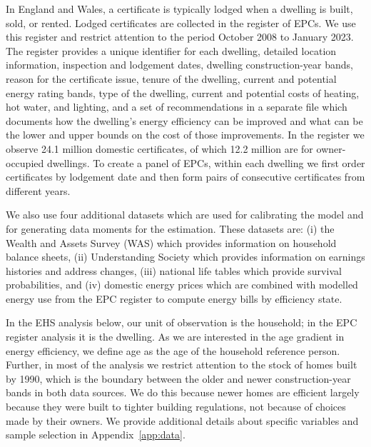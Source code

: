 In England and Wales, a certificate is typically lodged when a dwelling is built, sold, or rented. Lodged certificates are collected in the register of EPCs. We use this register and restrict attention to the period October 2008 to January 2023. The register provides a unique identifier for each dwelling, detailed location information, inspection and lodgement dates, dwelling construction-year bands, reason for the certificate issue, tenure of the dwelling, current and potential energy rating bands, type of the dwelling, current and potential costs of heating, hot water, and lighting, and a set of recommendations in a separate file which documents how the dwelling's energy efficiency can be improved and what can be the lower and upper bounds on the cost of those improvements. In the register we observe 24.1 million domestic certificates, of which 12.2 million are for owner-occupied dwellings. To create a panel of EPCs, within each dwelling we first order certificates by lodgement date and then form pairs of consecutive certificates from different years.


We also use four additional datasets which are used for calibrating the model and for generating data moments for the estimation. These datasets are: (i) the Wealth and Assets Survey (WAS) which provides information on household balance sheets, (ii) Understanding Society which provides information on earnings histories and address changes, (iii) national life tables which provide survival probabilities, and (iv) domestic energy prices which are combined with modelled energy use from the EPC register to compute energy bills by efficiency state.

In the EHS analysis below, our unit of observation is the household; in the EPC register analysis it is the dwelling. As we are interested in the age gradient in energy efficiency, we define age as the age of the household reference person. Further, in most of the analysis we restrict attention to the stock of homes built by 1990, which is the boundary between the older and newer construction-year bands in both data sources. We do this because newer homes are efficient largely because they were built to tighter building regulations, not because of choices made by their owners. We provide additional details about specific variables and sample selection in Appendix~\ref{app:data}.




